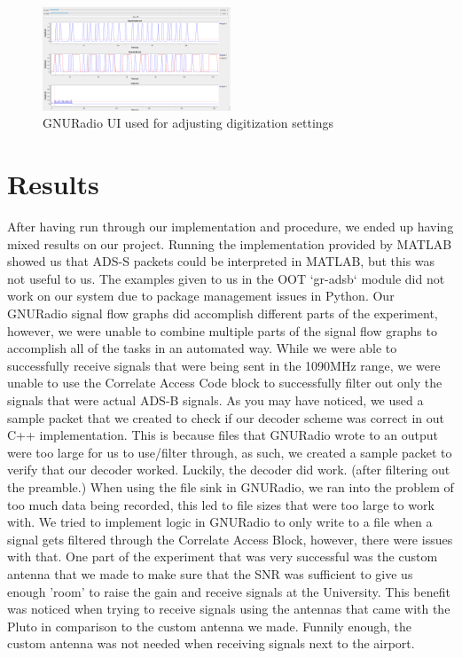 \documentclass[conference, onecolumn]{IEEEtran}
\begin{document}
\begin{figure}
  \begin{center}
    \includegraphics[width=0.5\textwidth]{./figures/fig_gnuradio_fullUI.png}
  \end{center}
  \caption{GNURadio UI used for adjusting digitization settings}\label{fig:receive_UI}
\end{figure}


\section{Results}
After having run through our implementation and procedure, we ended up having mixed results on our project. Running the implementation provided by MATLAB showed us that ADS-S packets could be interpreted in MATLAB, but this was not useful to us. The examples given to us in the OOT `gr-adsb` module did not work on our system due to package management issues in Python. Our GNURadio signal flow graphs did accomplish different parts of the experiment, however, we were unable to combine multiple parts of the signal flow graphs to accomplish all of the tasks in an automated way. While we were able to successfully receive signals that were being sent in the 1090MHz range, we were unable to use the Correlate Access Code block to successfully filter out only the signals that were actual ADS-B signals. As you may have noticed, we used a sample packet that we created to check if our decoder scheme was correct in out C++ implementation. This is because files that GNURadio wrote to an output were too large for us to use/filter through, as such, we created a sample packet to verify that our decoder worked. Luckily, the decoder did work. (after filtering out the preamble.) When using the file sink in GNURadio, we ran into the problem of too much data being recorded, this led to file sizes that were too large to work with. We tried to implement logic in GNURadio to only write to a file when a signal gets filtered through the Correlate Access Block, however, there were issues with that. One part of the experiment that was very successful was the custom antenna that we made to make sure that the SNR was sufficient to give us enough 'room' to raise the gain and receive signals at the University. This benefit was noticed when trying to receive signals using the antennas that came with the Pluto in comparison to the custom antenna we made. Funnily enough, the custom antenna was not needed when receiving signals next to the airport.
\end{document}
